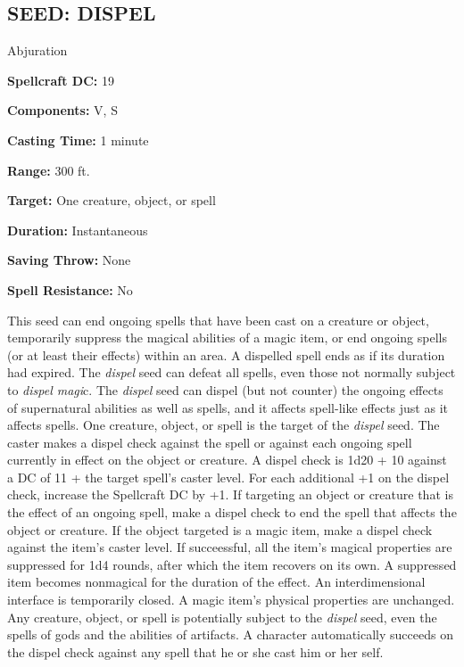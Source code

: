 \documentclass{article}
\begin{document}
\vspace{12pt}
\subsection*{SEED: DISPEL }

Abjuration 

\textbf{Spellcraft DC:} 19 

\textbf{Components:} V, S 

\textbf{Casting Time:} 1 minute 

\textbf{Range:} 300 ft. 

\textbf{Target:} One creature, object, or spell 

\textbf{Duration:} Instantaneous 

\textbf{Saving Throw:} None 

\textbf{Spell Resistance:} No 

This seed can end ongoing spells that have been cast on a creature or object, temporarily 
suppress the magical abilities of a magic item, or end ongoing spells (or at least 
their effects) within an area. A dispelled spell ends as if its duration had expired. 
The \textit{dispel }seed can defeat all spells, even those not normally subject 
to \textit{dispel magi}c. The \textit{dispel }seed can dispel (but not counter) 
the ongoing effects of supernatural abilities as well as spells, and it affects 
spell-like effects just as it affects spells. One creature, object, or spell is 
the target of the \textit{dispel }seed. The caster makes a dispel check against 
the spell or against each ongoing spell currently in effect on the object or creature. 
A dispel check is 1d20 + 10 against a DC of 11 + the target spell's caster level. 
For each additional +1 on the dispel check, increase the Spellcraft DC by +1. If 
targeting an object or creature that is the effect of an ongoing spell, make a 
dispel check to end the spell that affects the object or creature. If the object 
targeted is a magic item, make a dispel check against the item's caster level. 
If succeessful, all the item's magical properties are suppressed for 1d4 rounds, 
after which the item recovers on its own. A suppressed item becomes nonmagical 
for the duration of the effect. An interdimensional interface is temporarily closed. 
A magic item's physical properties are unchanged. Any creature, object, or spell 
is potentially subject to the \textit{dispel }seed, even the spells of gods and 
the abilities of artifacts. A character automatically succeeds on the dispel check 
against any spell that he or she cast him or her self. 
\end{document}
